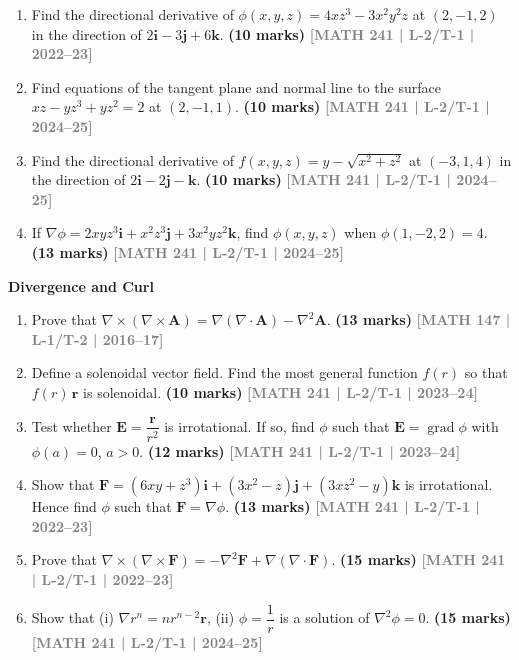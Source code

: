 \documentclass[12pt,a4paper]{article}
\newcommand{\yr}[1]{\hfill\textcolor{gray}{\small\textbf{[#1]}}}
\newcommand{\mk}[1]{\textcolor{orange!70!black}{\small\textbf{(#1 marks)}}}
\newcommand{\subtopic}[2]{%
  \vspace{10pt}
  \noindent\begin{tcolorbox}[colback=#1!8,colframe=#1,boxrule=0.6pt,arc=4pt,
    left=6pt,right=6pt,top=4pt,bottom=4pt]
    \small\bfseries\textcolor{#1}{#2}
  \end{tcolorbox}
  \vspace{2pt}
}
\begin{document}
\begin{enumerate}
\item Find the directional derivative of $\phi(x,y,z)=4xz^{3}-3x^{2}y^{2}z$ at $(2,-1,2)$ in the direction of $2\mathbf{i}-3\mathbf{j}+6\mathbf{k}$.
\mk{10} \yr{MATH 241 | L-2/T-1 | 2022--23}

\item Find equations of the tangent plane and normal line to the surface $xz-yz^{3}+yz^{2}=2$ at $(2,-1,1)$.
\mk{10} \yr{MATH 241 | L-2/T-1 | 2024--25}

\item Find the directional derivative of $f(x,y,z)=y-\sqrt{x^{2}+z^{2}}$ at $(-3,1,4)$ in the direction of $2\mathbf{i}-2\mathbf{j}-\mathbf{k}$.
\mk{10} \yr{MATH 241 | L-2/T-1 | 2024--25}

\item If $\nabla\phi=2xyz^{3}\mathbf{i}+x^{2}z^{3}\mathbf{j}+3x^{2}yz^{2}\mathbf{k}$, find $\phi(x,y,z)$ when $\phi(1,-2,2)=4$.
\mk{13} \yr{MATH 241 | L-2/T-1 | 2024--25}

\end{enumerate}

\subtopic{cD}{Divergence and Curl}
\label{sub:s4-divcurl}

\begin{enumerate}

\item Prove that $\nabla\times(\nabla\times\mathbf{A})=\nabla(\nabla\cdot\mathbf{A})-\nabla^{2}\mathbf{A}$.
\mk{13} \yr{MATH 147 | L-1/T-2 | 2016--17}

\item Define a solenoidal vector field. Find the most general function $f(r)$ so that $f(r)\,\mathbf{r}$ is solenoidal.
\mk{10} \yr{MATH 241 | L-2/T-1 | 2023--24}

\item Test whether $\mathbf{E}=\dfrac{\mathbf{r}}{r^{2}}$ is irrotational. If so, find $\phi$ such that $\mathbf{E}=\operatorname{grad}\phi$ with $\phi(a)=0$, $a>0$.
\mk{12} \yr{MATH 241 | L-2/T-1 | 2023--24}

\item Show that $\mathbf{F}=(6xy+z^{3})\mathbf{i}+(3x^{2}-z)\mathbf{j}+(3xz^{2}-y)\mathbf{k}$ is irrotational. Hence find $\phi$ such that $\mathbf{F}=\nabla\phi$.
\mk{13} \yr{MATH 241 | L-2/T-1 | 2022--23}

\item Prove that $\nabla\times(\nabla\times\mathbf{F})=-\nabla^{2}\mathbf{F}+\nabla(\nabla\cdot\mathbf{F})$.
\mk{15} \yr{MATH 241 | L-2/T-1 | 2022--23}

\item Show that (i) $\nabla r^{n}=nr^{n-2}\mathbf{r}$, (ii) $\phi=\dfrac{1}{r}$ is a solution of $\nabla^{2}\phi=0$.
\mk{15} \yr{MATH 241 | L-2/T-1 | 2024--25}

\end{enumerate}
\end{document}
